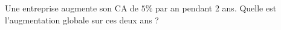 
\begin{exercice}\label{exoPremiere-0002}

    Une entreprise augmente son CA de \( 5\%\) par an pendant 2 ans. Quelle est l'augmentation globale sur ces deux ans ?

\end{exercice}
